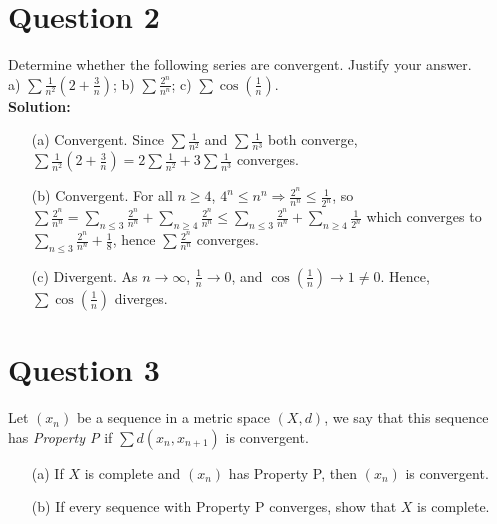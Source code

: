 \documentclass[12pt]{article}
\begin{document}
\newpage 

\section*{Question 2}
Determine whether the following series are convergent. Justify your answer. \\[0.5em]
a) $\sum \frac{1}{n^2}\left(2 + \frac{3}{n}\right)$; \quad b) $\sum \frac{2^n}{n^n}$; \quad c) $\sum \cos\left(\frac{1}{n}\right)$. \\

\noindent \textbf{Solution:}
\begin{enumerate}
    \item[(a)] Convergent. Since $\sum \frac{1}{n^2}$ and $\sum \frac{1}{n^3}$ both converge, $\sum \frac{1}{n^2}\left(2 + \frac{3}{n}\right) = 2\sum \frac{1}{n^2} + 3\sum \frac{1}{n^3}$ converges.
    \item[(b)] Convergent. For all $n \ge 4$, $4^n \le n^n \Rightarrow \frac{2^n}{n^n} \le \frac{1}{2^n}$, so $\sum \frac{2^n}{n^n} = \sum_{n \le 3} \frac{2^n}{n^n} + \sum_{n \ge 4} \frac{2^n}{n^n} \le \sum_{n \le 3} \frac{2^n}{n^n} + \sum_{n \ge 4} \frac{1}{2^n}$ which converges to $\sum_{n \le 3} \frac{2^n}{n^n} + \frac{1}{8}$, hence $\sum \frac{2^n}{n^n}$ converges.
    \item[(c)] Divergent. As $n \to \infty$, $\frac{1}{n} \to 0$, and $\cos\left(\frac{1}{n}\right) \to 1 \ne 0$. Hence, $\sum \cos\left(\frac{1}{n}\right)$ diverges.
\end{enumerate}
 
\section*{Question 3}
Let $(x_n)$ be a sequence in a metric space $(X, d)$, we say that this sequence has \textit{Property P} if $\sum d(x_n, x_{n+1})$ is convergent. \begin{enumerate}
    \item[(a)] If $X$ is complete and $(x_n)$ has Property P, then $(x_n)$ is convergent.
    \item[(b)] If every sequence with Property P converges, show that $X$ is complete.
\end{enumerate}
\end{document}
